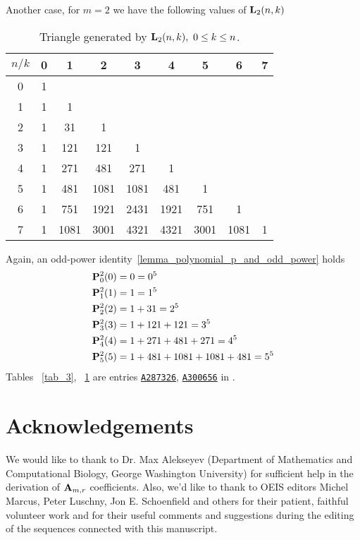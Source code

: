 \documentclass[12pt,letterpaper,oneside,reqno]{amsart}
\newcommand \coeffA [3][A] {{\mathbf{#1}} \sb{#2,#3}}
\newcommand \polynomialP [4][P]{{\mathbf{#1}}\sp{#2} \sb{#3}(#4)}
\newcommand \polynomialL [4][L]{{\mathbf{#1}}\sb{#2}(#3,#4)}
\numberwithin{equation}{section}
\begin{document}
    Another case, for $m=2$ we have the following values of $\polynomialL{2}{n}{k}$
    \begin{table}[H]
        \begin{tabular}{c|cccccccc}
            $n/k$ &0 &1 &2 &3 &4 &5 &6 &7 \\ [3px]
            \hline
            0 &1 & & & & & & & \\
            1 &1 &1 & & & & & & \\
            2 &1 &31 &1 & & & & & \\
            3 &1 &121 &121 &1 & & & & \\
            4 &1 &271 &481 &271 &1 & & & \\
            5 &1 &481 &1081 &1081 &481 &1 & & \\
            6 &1 &751 &1921 &2431 &1921 &751 &1 & \\
            7 &1 &1081 &3001 &4321 &4321 &3001 &1081 &1
        \end{tabular}
        \caption{Triangle generated by $\polynomialL{2}{n}{k}, \ 0\leq k\leq n$.}
        \label{tab_4}
    \end{table}
    Again, an odd-power identity~\ref{lemma_polynomial_p_and_odd_power} holds
    \begin{equation*}
        \begin{split}
            \polynomialP{2}{0}{0} &= 0 = 0^5 \\
            \polynomialP{2}{1}{1} &= 1 = 1^5 \\
            \polynomialP{2}{2}{2} &= 1+31 = 2^5 \\
            \polynomialP{2}{3}{3} &= 1+121+121 = 3^5 \\
            \polynomialP{2}{4}{4} &= 1+271+481+271 = 4^5 \\
            \polynomialP{2}{5}{5} &= 1+481+1081+1081+481 = 5^5
        \end{split}
    \end{equation*}
    Tables ~\ref{tab_3}, ~\ref{tab_4} are entries \href{https://oeis.org/A287326}{\texttt{A287326}}, \href{https://oeis.org/A300656}{\texttt{A300656}} in \cite{Sloane_theencyclopedia}.


    \section{Acknowledgements}
    We would like to thank to Dr. Max Alekseyev (Department of Mathematics and Computational Biology,
    George Washington University) for sufficient help in the derivation of $\coeffA{m}{r}$ coefficients.
    Also, we'd like to thank to OEIS editors Michel Marcus, Peter Luschny, Jon E. Schoenfield and others
    for their patient, faithful volunteer work and for their useful comments and suggestions during the
    editing of the sequences connected with this manuscript.
\end{document}
